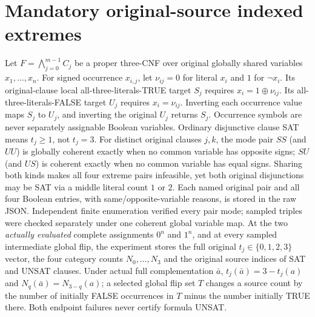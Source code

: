 \documentclass[10pt]{article}
\begin{document}
\section{Mandatory original-source indexed extremes}
Let $F=\bigwedge_{j=0}^{m-1}C_j$ be a proper three-CNF over original globally shared variables $x_1,\ldots,x_n$. For signed occurrence $x_{i,j}$, let $\nu_{ij}=0$ for literal $x_i$ and $1$ for $\neg x_i$. Its original-clause local all-three-literals-TRUE target $S_j$ requires $x_i=1\oplus\nu_{ij}$. Its all-three-literals-FALSE target $U_j$ requires $x_i=\nu_{ij}$. Inverting each occurrence value maps $S_j$ to $U_j$, and inverting the original $U_j$ returns $S_j$. Occurrence symbols are never separately assignable Boolean variables. Ordinary disjunctive clause SAT means $t_j\ge1$, not $t_j=3$.
For distinct original clauses $j,k$, the mode pair $SS$ (and $UU$) is globally coherent exactly when no common variable has opposite signs; $SU$ (and $US$) is coherent exactly when no common variable has equal signs. Sharing both kinds makes all four extreme pairs infeasible, yet both original disjunctions may be SAT via a middle literal count $1$ or $2$. Each named original pair and all four Boolean entries, with same/opposite-variable reasons, is stored in the raw JSON. Independent finite enumeration verified every pair mode; sampled triples were checked separately under one coherent global variable map.
At the two \emph{actually evaluated} complete assignments $0^n$ and $1^n$, and at every sampled intermediate global flip, the experiment stores the full original $t_j\in\{0,1,2,3\}$ vector, the four category counts $N_0,\ldots,N_3$ and the original source indices of SAT and UNSAT clauses. Under actual full complementation $\bar a$, $t_j(\bar a)=3-t_j(a)$ and $N_q(\bar a)=N_{3-q}(a)$; a selected global flip set $T$ changes a source count by the number of initially FALSE occurrences in $T$ minus the number initially TRUE there. Both endpoint failures never certify formula UNSAT.
\end{document}
